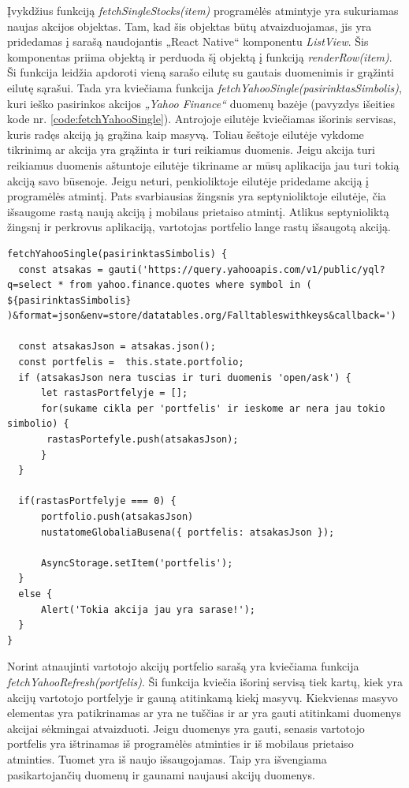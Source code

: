 \documentclass[a4paper,12pt,fleqn]{article}
\begin{document}
Įvykdžius funkciją \textit{fetchSingleStocks(item)} programėlės atmintyje yra sukuriamas naujas akcijos objektas. Tam, kad šis objektas būtų atvaizduojamas, jis yra pridedamas į sarašą naudojantis „React Native“ komponentu \textit{ListView}. Šis komponentas priima objektą ir perduoda šį objektą į funkciją \textit{renderRow(item)}. Ši funkcija leidžia apdoroti vieną sarašo eilutę su gautais duomenimis ir grąžinti eilutę sąrašui. Tada yra kviečiama funkcija \textit{fetchYahooSingle(pasirinktasSimbolis)}, kuri ieško pasirinkos akcijos \textit{„Yahoo Finance“} duomenų bazėje (pavyzdys išeities kode nr. \ref{code:fetchYahooSingle}). Antrojoje eilutėje kviečiamas išorinis servisas, kuris radęs akciją ją grąžina kaip masyvą. Toliau šeštoje eilutėje vykdome tikrinimą ar akcija yra grąžinta ir turi reikiamus duomenis. Jeigu akcija turi reikiamus duomenis aštuntoje eilutėje tikriname ar mūsų aplikacija jau turi tokią akciją savo būsenoje. Jeigu neturi, penkioliktoje eilutėje pridedame akciją į programėlės atmintį. Pats svarbiausias žingsnis yra septynioliktoje eilutėje, čia išsaugome rastą naują akciją į mobilaus prietaiso atmintį. Atlikus septynioliktą žingsnį ir perkrovus aplikaciją, vartotojas portfelio lange rastų išsaugotą akciją.

\newpage
\begin{lstlisting}[caption={Funkcijos fetchYahooSingle() pseudokodas.}, label={code:fetchYahooSingle}]
fetchYahooSingle(pasirinktasSimbolis) {
  const atsakas = gauti('https://query.yahooapis.com/v1/public/yql?q=select * from yahoo.finance.quotes where symbol in ( ${pasirinktasSimbolis} )&format=json&env=store/datatables.org/Falltableswithkeys&callback=')
  
  const atsakasJson = atsakas.json();
  const portfelis =  this.state.portfolio;
  if (atsakasJson nera tuscias ir turi duomenis 'open/ask') {
	  let rastasPortfelyje = [];
	  for(sukame cikla per 'portfelis' ir ieskome ar nera jau tokio simbolio) {
	   rastasPortefyle.push(atsakasJson);
	  }
  }
  
  if(rastasPortfelyje === 0) {
	  portfolio.push(atsakasJson)
	  nustatomeGlobaliaBusena({ portfelis: atsakasJson });
	  
	  AsyncStorage.setItem('portfelis');
  } 
  else {
	  Alert('Tokia akcija jau yra sarase!');
  }
}
\end{lstlisting}

Norint atnaujinti vartotojo akcijų portfelio sarašą yra kviečiama funkcija \textit{fetchYahooRefresh(portfelis)}. Ši funkcija kviečia išorinį servisą tiek kartų, kiek yra akcijų vartotojo portfelyje ir gauną atitinkamą kiekį masyvų. Kiekvienas masyvo elementas yra patikrinamas ar yra ne tuščias ir ar yra gauti atitinkami duomenys akcijai sėkmingai atvaizduoti. Jeigu duomenys yra gauti, senasis vartotojo portfelis yra ištrinamas iš programėlės atminties ir iš mobilaus prietaiso atminties. Tuomet yra iš naujo išsaugojamas. Taip yra išvengiama pasikartojančių duomenų ir gaunami naujausi akcijų duomenys.
\end{document}
